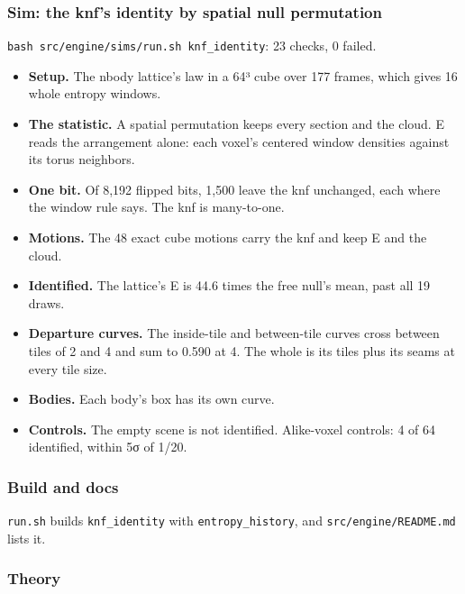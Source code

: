 \subsubsection{\texorpdfstring{Sim: the knf's identity by spatial null permutation}{Sim: the knf's identity by spatial null permutation}}

\texttt{bash src/\allowbreak{}engine/\allowbreak{}sims/\allowbreak{}run.\allowbreak{}sh knf\_\allowbreak{}identity}: 23 checks, 0 failed.

\begin{itemize}
\item \textbf{Setup.} The nbody lattice's law in a 64³ cube over 177 frames, which gives 16 whole entropy windows.
\item \textbf{The statistic.} A spatial permutation keeps every section and the cloud. E reads the arrangement alone: each voxel's centered window densities against its torus neighbors.
\item \textbf{One bit.} Of 8,192 flipped bits, 1,500 leave the knf unchanged, each where the window rule says. The knf is many-to-one.
\item \textbf{Motions.} The 48 exact cube motions carry the knf and keep E and the cloud.
\item \textbf{Identified.} The lattice's E is 44.6 times the free null's mean, past all 19 draws.
\item \textbf{Departure curves.} The inside-tile and between-tile curves cross between tiles of 2 and 4 and sum to 0.590 at 4. The whole is its tiles plus its seams at every tile size.
\item \textbf{Bodies.} Each body's box has its own curve.
\item \textbf{Controls.} The empty scene is not identified. Alike-voxel controls: 4 of 64 identified, within 5σ of 1/20.
\end{itemize}

\subsubsection{\texorpdfstring{Build and docs}{Build and docs}}

\texttt{run.\allowbreak{}sh} builds \texttt{knf\_\allowbreak{}identity} with \texttt{entropy\_\allowbreak{}history}, and \texttt{src/\allowbreak{}engine/\allowbreak{}README.\allowbreak{}md} lists it.

\subsubsection{\texorpdfstring{Theory}{Theory}}

